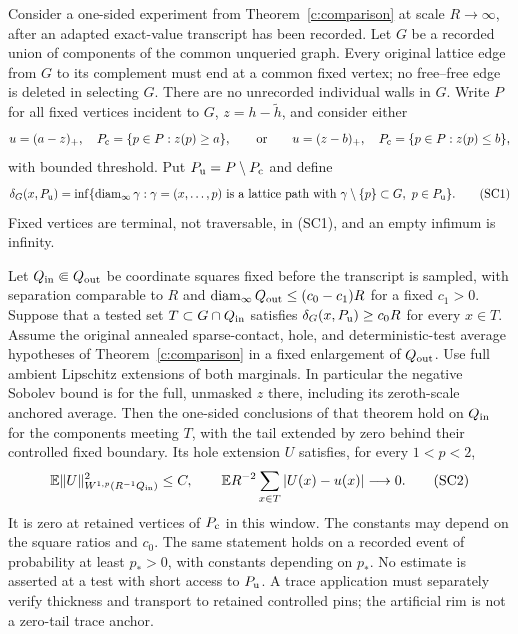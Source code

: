 \begin{lemma}\label{g:screened-comparison}
Consider a one-sided experiment from Theorem~\ref{c:comparison} at
scale $R\to\infty$, after an adapted exact-value transcript has been
recorded. Let $G$ be a recorded union of components of the common
unqueried graph. Every original lattice edge from $G$ to its complement
must end at a common fixed vertex; no free--free edge is deleted in
selecting $G$. There are no unrecorded individual walls in $G$.
Write $P$ for all fixed vertices incident to $G$, $z=h-\widetilde h$,
and consider either
\[
 u=(a-z)_+,\quad P_{\rm c}=\{p\in P:z(p)\ge a\},
 \qquad\hbox{or}\qquad
 u=(z-b)_+,\quad P_{\rm c}=\{p\in P:z(p)\le b\},
\]
with bounded threshold. Put $P_{\rm u}=P\setminus P_{\rm c}$ and define
\[
 \delta_G(x,P_{\rm u})=
 \inf\{\operatorname{diam}_\infty\gamma:
 \gamma=(x,\ldots,p)\text{ is a lattice path with }
 \gamma\setminus\{p\}\subset G,\ p\in P_{\rm u}\}.       \tag{SC1}
\]
Fixed vertices are terminal, not traversable, in (SC1), and an empty
infimum is infinity.

Let $Q_{\rm in}\Subset Q_{\rm out}$ be coordinate squares fixed before
the transcript is sampled, with separation comparable to $R$ and
$\operatorname{diam}_\infty Q_{\rm out}\le(c_0-c_1)R$ for a fixed
$c_1>0$. Suppose that a tested set
$T\subset G\cap Q_{\rm in}$ satisfies
$\delta_G(x,P_{\rm u})\ge c_0R$ for every $x\in T$. Assume the original
annealed sparse-contact, hole, and deterministic-test average hypotheses
of Theorem~\ref{c:comparison} in a fixed enlargement of $Q_{\rm out}$.
Use full ambient Lipschitz extensions of both marginals. In particular
the negative Sobolev bound is for the full, unmasked $z$ there, including
its zeroth-scale anchored average. Then the one-sided conclusions of that theorem hold on
$Q_{\rm in}$ for the components meeting $T$, with the tail extended
by zero behind their controlled fixed boundary. Its hole extension $U$
satisfies, for every $1<p<2$,
\[
 \mathbb E\|U\|_{W^{1,p}(R^{-1}Q_{\rm in})}^2\le C,\qquad
 \mathbb E R^{-2}\sum_{x\in T}|U(x)-u(x)|\longrightarrow0.     \tag{SC2}
\]
It is zero at retained vertices of $P_{\rm c}$ in this window. The
constants may depend on the square ratios and $c_0$. The same statement
holds on a recorded event of probability at least $p_*>0$, with
constants depending on $p_*$. No estimate is asserted at a test with
short access to $P_{\rm u}$. A trace application must separately verify
thickness and transport to retained controlled pins; the artificial rim
is not a zero-tail trace anchor.
\end{lemma}


